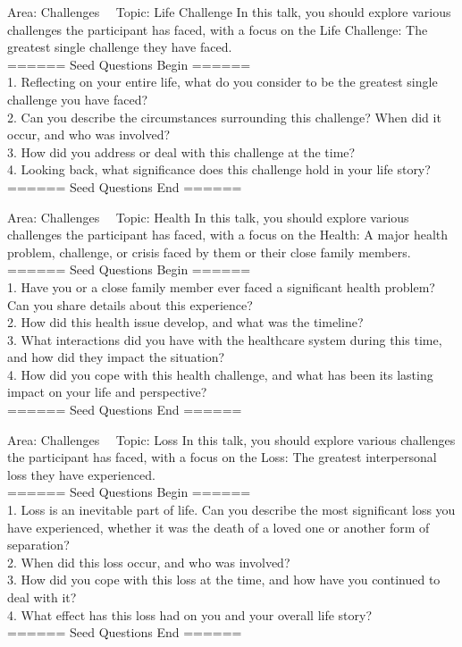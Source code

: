 \begin{mybox}{Area: Challenges \ \ Topic: Life Challenge}
In this talk, you should explore various challenges the participant has faced, with a focus on the Life Challenge: The greatest single challenge they have faced. \\
====== Seed Questions Begin ====== \\
1. Reflecting on your entire life, what do you consider to be the greatest single challenge you have faced? \\
2. Can you describe the circumstances surrounding this challenge? When did it occur, and who was involved? \\
3. How did you address or deal with this challenge at the time? \\
4. Looking back, what significance does this challenge hold in your life story? \\
====== Seed Questions End ====== \\
\end{mybox}

\begin{mybox}{Area: Challenges \ \ Topic: Health}
In this talk, you should explore various challenges the participant has faced, with a focus on the Health: A major health problem, challenge, or crisis faced by them or their close family members. \\
====== Seed Questions Begin ====== \\
1. Have you or a close family member ever faced a significant health problem? Can you share details about this experience? \\
2. How did this health issue develop, and what was the timeline? \\
3. What interactions did you have with the healthcare system during this time, and how did they impact the situation? \\
4. How did you cope with this health challenge, and what has been its lasting impact on your life and perspective? \\
====== Seed Questions End ====== \\
\end{mybox}

\begin{mybox}{Area: Challenges \ \ Topic: Loss}
In this talk, you should explore various challenges the participant has faced, with a focus on the Loss: The greatest interpersonal loss they have experienced. \\
====== Seed Questions Begin ====== \\
1. Loss is an inevitable part of life. Can you describe the most significant loss you have experienced, whether it was the death of a loved one or another form of separation? \\
2. When did this loss occur, and who was involved? \\
3. How did you cope with this loss at the time, and how have you continued to deal with it? \\
4. What effect has this loss had on you and your overall life story? \\
====== Seed Questions End ====== \\
\end{mybox}

